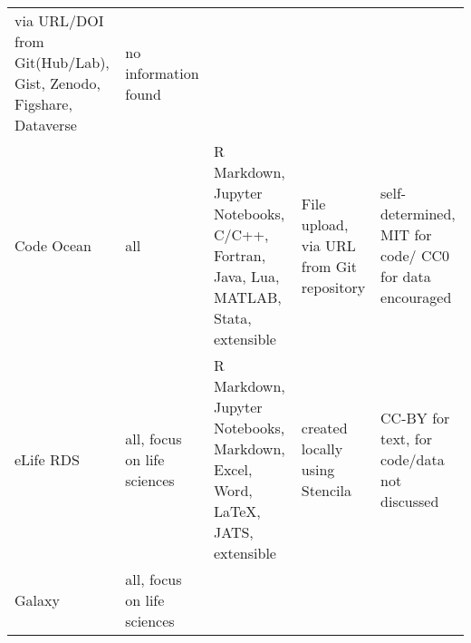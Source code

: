 \documentclass[onecolumn]{article}
\begin{document}
\begin{longtable}[]{@{}lllll@{}}
\begin{minipage}[t]{0.21\columnwidth}
via URL/DOI from Git(Hub/Lab), Gist, Zenodo, Figshare, Dataverse\strut
\end{minipage} & \begin{minipage}[t]{0.21\columnwidth}\raggedright
no information found\strut
\end{minipage}\tabularnewline
\begin{minipage}[t]{0.11\columnwidth}\raggedright
Code Ocean\strut
\end{minipage} & \begin{minipage}[t]{0.11\columnwidth}\raggedright
all\strut
\end{minipage} & \begin{minipage}[t]{0.21\columnwidth}\raggedright
R Markdown, Jupyter Notebooks, C/C++, Fortran, Java, Lua, MATLAB, Stata,
extensible\strut
\end{minipage} & \begin{minipage}[t]{0.21\columnwidth}\raggedright
File upload, via URL from Git repository\strut
\end{minipage} & \begin{minipage}[t]{0.21\columnwidth}\raggedright
self-determined, MIT for code/ CC0 for data encouraged\strut
\end{minipage}\tabularnewline
\begin{minipage}[t]{0.11\columnwidth}\raggedright
eLife RDS\strut
\end{minipage} & \begin{minipage}[t]{0.11\columnwidth}\raggedright
all, focus on life sciences\strut
\end{minipage} & \begin{minipage}[t]{0.21\columnwidth}\raggedright
R Markdown, Jupyter Notebooks, Markdown, Excel, Word, LaTeX, JATS,
extensible\strut
\end{minipage} & \begin{minipage}[t]{0.21\columnwidth}\raggedright
created locally using Stencila\strut
\end{minipage} & \begin{minipage}[t]{0.21\columnwidth}\raggedright
CC-BY for text, for code/data not discussed\strut
\end{minipage}\tabularnewline
\begin{minipage}[t]{0.11\columnwidth}\raggedright
Galaxy\strut
\end{minipage} & \begin{minipage}[t]{0.11\columnwidth}\raggedright
all, focus on life sciences\strut
\end{minipage} & \begin{minipage}[t]{0.21\columnwidth}\raggedright

\end{minipage}
\end{longtable}
\end{document}
